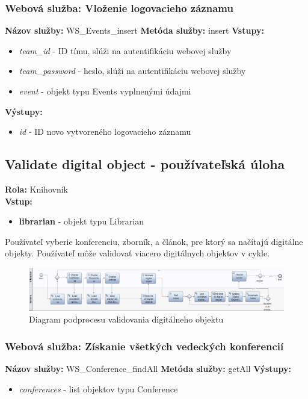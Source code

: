\documentclass[10pt,oneside,slovak,a4paper]{article}
\begin{document}
\subsubsection{Webová služba: Vloženie logovacieho záznamu}
\textbf{Názov služby:} WS\_Events\_insert
\textbf{Metóda služby:} insert
\textbf{Vstupy:}
	\begin{itemize}
		\item \textit{team\_id} - ID tímu, slúži na autentifikáciu webovej služby
		\item \textit{team\_password} - heslo, slúži na autentifikáciu webovej služby
		\item \textit{event} - objekt typu Events vyplnenými údajmi
	\end{itemize}
\textbf{Výstupy:}
	\begin{itemize}
		\item \textit{id} - ID novo vytvoreného logovacieho záznamu
	\end{itemize}
	
\subsection{Validate digital object - používateľská úloha}
\textbf{Rola:} Knihovník\\
\textbf{Vstup:}

\begin{itemize}
\item \textbf{librarian} - objekt typu Librarian
\end{itemize}

Používateľ vyberie konferenciu, zborník, a článok, pre ktorý sa načítajú digitálne objekty. Používateľ môže validovať viacero digitálnych objektov v cykle.

\begin{figure} [H]
\centering
\includegraphics[scale=0.4]{diagrams/diagValidate.jpg} 
\caption{Diagram podprocesu validovania digitálneho objektu}
\end{figure}

\subsubsection{Webová služba: Získanie všetkých vedeckých konferencií}
\textbf{Názov služby:} WS\_Conference\_findAll
\textbf{Metóda služby:} getAll
\textbf{Výstupy:}
	\begin{itemize}
		\item \textit{conferences} - list objektov typu Conference
	\end{itemize}
	
\end{document}

